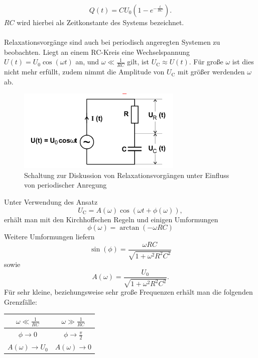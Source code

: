 \begin{equation}
	\label{eqn:entladung}
	Q(t)=CU_\text{0}(  1-e^{-\frac{t}{RC}} ) .
\end{equation}
$RC$ wird hierbei als Zeitkonstante des Systems bezeichnet.\\
\\Relaxationsvorgänge sind auch bei periodisch angeregten Systemen zu beobachten.
Liegt an einem RC-Kreis eine Wechselspannung $U(t)=U_\text{0}\cos(\omega t)$ an, und $\omega \ll \frac{1}{RC}$ gilt, ist $U_\text{C} \approx U(t)$.
Für große $\omega$ ist dies nicht mehr erfüllt, zudem nimmt die Amplitude von $U_\text{C}$ mit größer werdenden $\omega$ ab.
\begin{figure}
	\centering
	\includegraphics[width=0.7\textwidth]{bilder/periodisch.png}
	\caption{Schaltung zur Diskussion von Relaxationsvorgängen unter Einfluss von periodischer Anregung \cite{Anleitung}}
	\label{fig:periodisch}
\end{figure}
Unter Verwendung des Ansatz
\begin{equation*}
	U_\text{C}=A(\omega)\cos(\omega t +\phi(\omega)) ,
\end{equation*}
erhält man mit den Kirchhoffschen Regeln und einigen Umformungen
\begin{equation}
	\label{eqn:phase}
	\phi(\omega)=\arctan(-\omega RC)
\end{equation}
Weitere Umformungen liefern
\begin{equation}
	\label{eqn:sinphase}
	\sin(\phi)=\frac{\omega RC}{\sqrt{1+\omega ^2R^2C^2}}
\end{equation}
sowie
\begin{equation}
	\label{eqn:amplitude}
	A(\omega)=\frac{U_\text{0}}{\sqrt{1+\omega ^2R^2C^2}} .
\end{equation}
Für sehr kleine, beziehungsweise sehr große Frequenzen erhält man die folgenden Grenzfälle:

\begin{table}
	\centering
	\label{tab:tab1}
	\begin{tabular}{cc}
		\toprule
		$\omega \ll \frac{1}{RC} $  & $ \omega \gg \frac{1}{RC}$ \\
		\midrule
		$\phi \to 0$                & $\phi \to \frac{\pi}{2}$   \\
		$A(\omega) \to U_\text{0} $ & $A(\omega) \to 0$          \\
		\bottomrule
	\end{tabular}
\end{table}

